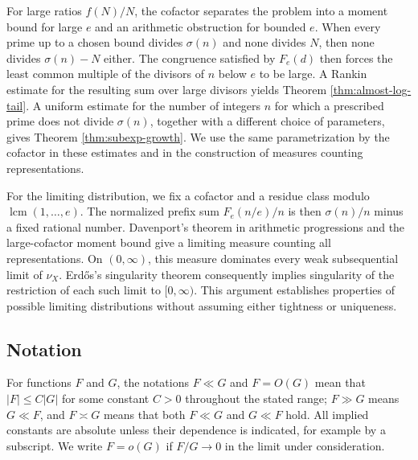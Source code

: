\documentclass[11pt,letterpaper,reqno]{amsart}
\numberwithin{equation}{section}
\theoremstyle{remark}
\DeclareMathOperator{\lcm}{lcm}
\renewcommand{\leq}{\leqslant}
\begin{document}
For large ratios $f(N)/N$, the cofactor separates the problem into a moment bound
for large $e$ and an arithmetic obstruction for bounded $e$. When every
prime up to a chosen bound divides $\sigma(n)$ and none divides $N$, then none divides $\sigma(n)-N$ either. The congruence satisfied by $F_e(d)$
then forces the least
common multiple of the divisors of $n$ below $e$ to be large.
A Rankin estimate for the resulting sum over large divisors yields
Theorem \ref{thm:almost-log-tail}. A uniform estimate for the number of
integers $n$ for which a prescribed prime does not divide $\sigma(n)$,
together with a different choice of parameters, gives
Theorem \ref{thm:subexp-growth}. We use the same parametrization by the
cofactor in these estimates and in the construction of measures counting
representations.

For the limiting distribution, we fix a cofactor and a residue class modulo
$\lcm(1,\ldots,e)$. The normalized prefix sum $F_e(n/e)/n$ is then
$\sigma(n)/n$ minus a fixed rational number. Davenport's theorem in
arithmetic progressions \cite{PollackPalindromes} and the large-cofactor
moment bound give a limiting measure counting all representations. On
$(0,\infty)$, this measure dominates every weak subsequential limit of
$\nu_X$. Erd\H{o}s's singularity theorem \cite{ErdosDistribution}
consequently implies singularity of the restriction of each such limit to
$[0,\infty)$. This argument establishes properties of possible limiting
distributions without assuming either tightness or uniqueness.


\subsection{Notation}
For functions $F$ and $G$, the notations $F\ll G$ and $F=O(G)$ mean that $|F|\leq C|G|$ for some constant $C>0$ throughout the stated range;
$F\gg G$ means $G\ll F$, and $F\asymp G$ means that both $F\ll G$ and $G\ll F$ hold. All implied constants are absolute unless their dependence is indicated, for example by a subscript.
We write $F=o(G)$ if $F/G\to0$ in the limit under consideration.
\end{document}
